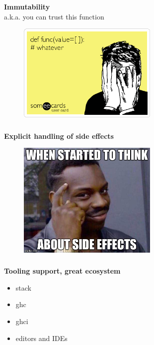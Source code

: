 \documentclass[usenames,dvipsnames, 18pt, compress, aspectratio=169]{beamer}
\begin{document}
\begin{frame}
    \frametitle{}
    \begin{center}
    \textbf{Immutability}\\
    a.k.a. you can trust this function
    \begin{figure}
        \includegraphics[width=0.6\textwidth,center]{immutability.png}
    \end{figure}
    \end{center}
\end{frame}

\begin{frame}
    \frametitle{}
    \begin{center}
    \textbf{Explicit handling of side effects}
    \begin{figure}
        \includegraphics[width=0.6\textwidth,center]{side_effects.jpg}
    \end{figure}
    \end{center}
\end{frame}

\begin{frame}
    \frametitle{}
    \begin{center}
    \textbf{Tooling support, great ecosystem}
    \begin{itemize}[label={\MVRightarrow}]
        \item stack
        \item ghc
        \item ghci
        \item editors and IDEs
    \end{itemize}
    \end{center}
\end{frame}
\end{document}
